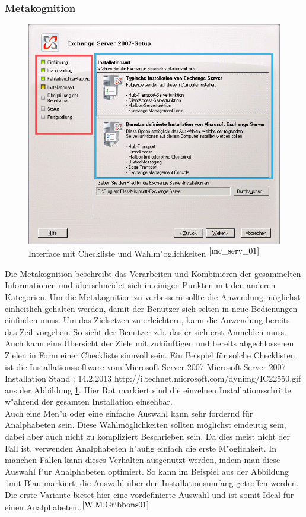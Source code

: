 \subsubsection{Metakognition}
\begin{figure}[h]
	\centering
		\includegraphics[width=1.00\textwidth]{Daten/ServerBeispiel.png}
	\caption{Interface mit Checkliste und Wahlm"oglichkeiten $^{\ref{mc_serv_01}}$}
	\label{fig:InstallBsp}
\end{figure}
Die Metakognition beschreibt das Verarbeiten und Kombinieren der gesammelten Informationen und überschneidet sich in einigen Punkten mit den anderen Kategorien. Um die Metakognition zu verbessern sollte die Anwendung möglichst einheitlich gehalten werden, damit der Benutzer sich selten in neue Bedienungen einfinden muss. Um das Zielsetzen zu erleichtern, kann die Anwendung bereits das Zeil vorgeben. So sieht der Benutzer z.b. das er sich erst Anmelden muss. Auch kann eine Übersicht der Ziele mit zukünftigen und bereits abgechlossenen Zielen in Form einer Checkliste sinnvoll sein. Ein Beispiel für solche Checklisten ist die Installationssoftware vom Microsoft-Server 2007
						{Microsoft-Server 2007 Installation}
						{Stand : 14.2.2013}
						{http://i.technet.microsoft.com/dynimg/IC22550.gif} 
aus der Abbildung \ref{fig:InstallBsp}. Hier Rot markiert sind die einzelnen Installationsschritte w"ahrend der gesamten Installation einsehbar.\\
Auch eine Men"u oder eine einfache Auswahl kann sehr fordernd für Analphabeten sein. Diese Wahlmöglichkeiten sollten möglichst eindeutig sein, dabei aber auch nicht zu kompliziert Beschrieben sein. Da dies meist nicht der Fall ist, verwenden Analphabeten h"aufig
einfach die erste M"oglichkeit. In manchen Fällen kann dieses Verhalten ausgenutzt werden, indem man diese Auswahl f"ur Analphabeten optimiert. So kann im Beispiel aus der Abbildung \ref{fig:InstallBsp}mit Blau markiert, die Auswahl über den Installationsumfang getroffen werden. Die erste Variante bietet hier eine vordefinierte Auswahl und ist somit Ideal für einen Analphabeten..$^{\ref{W.M.Gribbons01}}$\\


